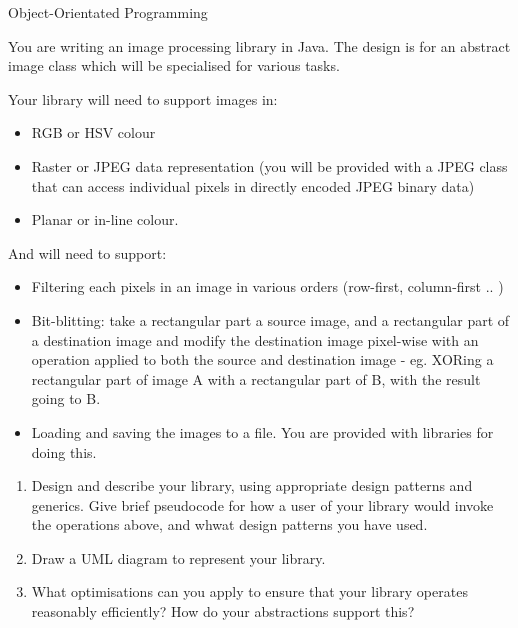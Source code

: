 \documentclass{tripos}  %
\begin{document}
\begin{question}[MockIA,year=2024,paper=1,question=6,author=rrw]{Object-Orientated Programming}

You are writing an image processing library in Java. The design is
for an abstract image class which will be specialised for various
tasks.

Your library will need to support images in:

\begin{itemize}
\item RGB or HSV colour
\item Raster or JPEG data representation (you will be provided with a JPEG class that can access individual pixels in directly encoded JPEG binary data)
\item Planar or in-line colour.
\end{itemize}

And will need to support:

\begin{itemize}
\item Filtering each pixels in an image in various orders (row-first, column-first .. )
\item Bit-blitting: take a rectangular part a source image, and a rectangular part of a destination image and modify the destination image pixel-wise with an operation applied to both the source and destination image - eg. XORing a rectangular part of image A with a rectangular part of B, with the result going to B.
\item Loading and saving the images to a file. You are provided with libraries for doing this.
\end{itemize}

\begin{enumerate}
\item Design and describe your library, using appropriate design
  patterns and generics. Give brief pseudocode for how a user of your
  library would invoke the operations above, and whwat design patterns
  you have used.  
\item Draw a UML diagram to represent your library.
\item What optimisations can you apply to ensure that your library operates reasonably efficiently? How do your abstractions support this?
\end{enumerate}

\end{question}
\end{document}
